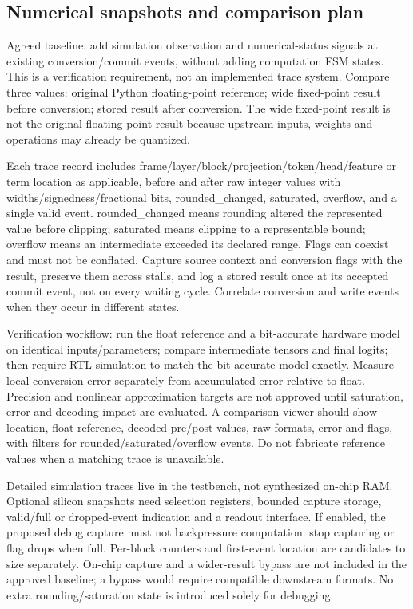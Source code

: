 \documentclass[11pt,a4paper]{article}
\begin{document}
\subsection{Numerical snapshots and comparison plan}

Agreed baseline: add simulation observation and numerical-status signals at existing conversion/commit events, without adding computation FSM states. This is a verification requirement, not an implemented trace system. Compare three values: original Python floating-point reference; wide fixed-point result before conversion; stored result after conversion. The wide fixed-point result is not the original floating-point result because upstream inputs, weights and operations may already be quantized.

Each trace record includes frame/layer/block/projection/token/head/feature or term location as applicable, before and after raw integer values with widths/signedness/fractional bits, rounded\_changed, saturated, overflow, and a single valid event. rounded\_changed means rounding altered the represented value before clipping; saturated means clipping to a representable bound; overflow means an intermediate exceeded its declared range. Flags can coexist and must not be conflated. Capture source context and conversion flags with the result, preserve them across stalls, and log a stored result once at its accepted commit event, not on every waiting cycle. Correlate conversion and write events when they occur in different states.

Verification workflow: run the float reference and a bit-accurate hardware model on identical inputs/parameters; compare intermediate tensors and final logits; then require RTL simulation to match the bit-accurate model exactly. Measure local conversion error separately from accumulated error relative to float. Precision and nonlinear approximation targets are not approved until saturation, error and decoding impact are evaluated. A comparison viewer should show location, float reference, decoded pre/post values, raw formats, error and flags, with filters for rounded/saturated/overflow events. Do not fabricate reference values when a matching trace is unavailable.

Detailed simulation traces live in the testbench, not synthesized on-chip RAM. Optional silicon snapshots need selection registers, bounded capture storage, valid/full or dropped-event indication and a readout interface. If enabled, the proposed debug capture must not backpressure computation: stop capturing or flag drops when full. Per-block counters and first-event location are candidates to size separately. On-chip capture and a wider-result bypass are not included in the approved baseline; a bypass would require compatible downstream formats. No extra rounding/saturation state is introduced solely for debugging.
\end{document}
